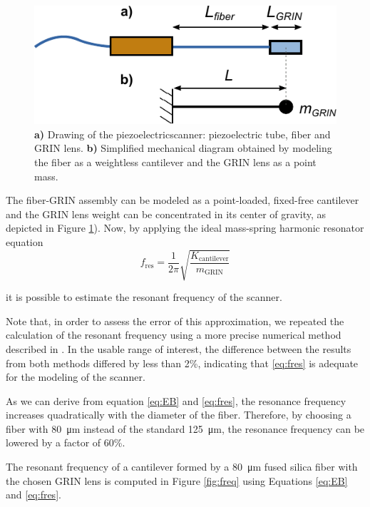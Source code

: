 \begin{figure}[h!]\centering
      \includegraphics{figures/30_DesignSimulation/Mechanical/EB.pdf}
      \caption{\textbf{a)} Drawing of the piezoelectricscanner: piezoelectric tube, fiber and GRIN lens. 
      \textbf{b)} Simplified mechanical diagram obtained by modeling the fiber as a weightless cantilever and the GRIN lens as a point mass.}
      \label{fig:EB}
\end{figure}

The fiber-GRIN assembly can be modeled as a point-loaded, fixed-free cantilever and the GRIN lens weight can be concentrated in its center of gravity, as depicted in Figure \ref{fig:EB}). Now, by applying the ideal mass-spring harmonic resonator equation 
\begin{equation}
f_\mathrm{res} = \frac{1}{2 \pi} \sqrt{\frac{K_\mathrm{cantilever}}{m_{\mathrm{GRIN}}}} 
\label{eq:fres}
\end{equation}

it is possible to estimate the resonant frequency of the scanner. 

Note that, in order to assess the error of this approximation, we repeated the calculation of the resonant frequency using a more precise numerical method described in \cite{Huo2010}. In the usable range of interest, the difference between the results from both methods differed by less than 2\%, indicating that \autoref{eq:fres} is adequate for the modeling of the scanner.

As we can derive from equation \ref{eq:EB} and \ref{eq:fres}, the resonance frequency increases quadratically with the diameter of the fiber. Therefore, by choosing a fiber with \SI{80}{\micro\meter} instead of the standard \SI{125}{\micro\meter}, the resonance frequency can be lowered by a factor of 60\%.

The resonant frequency of a cantilever formed by a \SI{80}{\micro\meter} fused silica fiber with the chosen GRIN lens is computed in Figure \ref{fig:freq} using Equations \ref{eq:EB} and \ref{eq:fres}.


